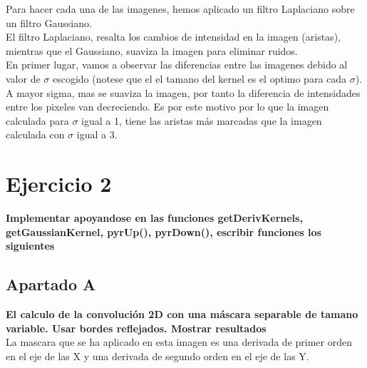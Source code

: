 \documentclass{article}
\begin{document}
Para hacer cada una de las imagenes, hemos aplicado un filtro Laplaciano sobre un filtro Gaussiano.
\\

El filtro Laplaciano, resalta los cambios de intensidad en la imagen (aristas), mientras que el Gaussiano, suaviza la imagen para eliminar ruidos.
\\

En primer lugar, vamos a observar las diferencias entre las imagenes debido al valor de $\sigma$ escogido (notese que el el tamano del kernel es el optimo para cada $\sigma$).
\\

A mayor sigma, mas se suaviza la imagen, por tanto la diferencia de intensidades entre los pixeles van decreciendo. Es por este motivo por lo que la imagen calculada para $\sigma$ igual a 1, tiene las aristas más marcadas que la imagen calculada con $\sigma$ igual a 3.
\\

\newpage
\section*{Ejercicio 2}
\textbf{Implementar apoyandose en las funciones getDerivKernels, getGaussianKernel, pyrUp(), pyrDown(), escribir funciones los siguientes}

\subsection*{Apartado A}
\textbf{El calculo de la convolución 2D con una máscara separable de tamano variable. Usar bordes reflejados. Mostrar resultados}
\\

La mascara que se ha aplicado en esta imagen es una derivada de primer orden en el eje de las X y una derivada de segundo orden en el eje de las Y.
\end{document}
